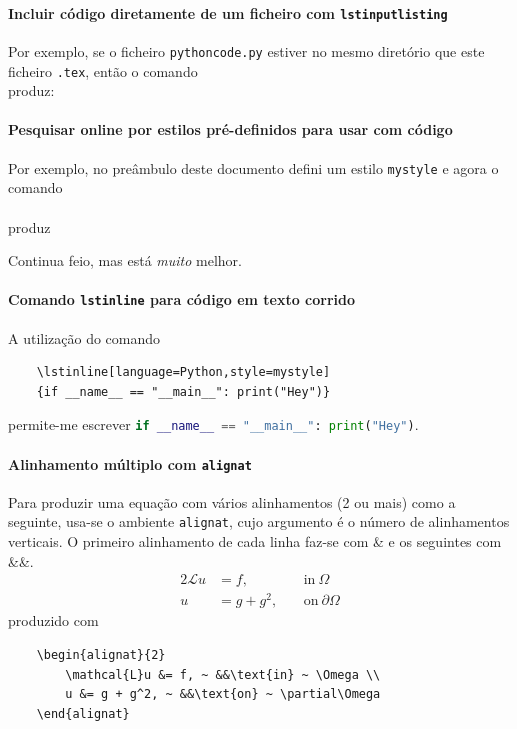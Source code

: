 \documentclass[11pt]{article}
\begin{document}
\paragraph{Incluir código diretamente de um ficheiro com \texttt{lstinputlisting}}
Por exemplo, se o ficheiro \texttt{pythoncode.py} estiver no mesmo diretório que
este ficheiro \texttt{.tex}, então o comando \\
\verb|| produz:



\paragraph{Pesquisar online por estilos pré-definidos para usar com código}
Por exemplo, no preâmbulo deste documento defini um estilo \texttt{mystyle} e agora
o comando \\
\verb|| \\
produz



Continua feio, mas está \textit{muito} melhor.

\paragraph{Comando \texttt{lstinline} para código em texto corrido}
A utilização do comando
\begin{verbatim}
    \lstinline[language=Python,style=mystyle]
    {if __name__ == "__main__": print("Hey")}
\end{verbatim}
permite-me escrever
\lstinline[language=Python,style=mystyle]{if __name__ == "__main__": print("Hey")}.

\paragraph{Alinhamento múltiplo com \texttt{alignat}}
Para produzir uma equação com vários alinhamentos (2 ou mais) como a seguinte,
usa-se o ambiente \texttt{alignat}, cujo argumento é o número de alinhamentos
verticais.
O primeiro alinhamento de cada linha faz-se com \& e os seguintes com \&\&.
\begin{alignat}{2}
    \mathcal{L}u &= f, ~ &&\text{in} ~ \Omega \\
    u &= g + g^2, ~ &&\text{on} ~ \partial\Omega
\end{alignat}
produzido com
\begin{verbatim}
    \begin{alignat}{2}
        \mathcal{L}u &= f, ~ &&\text{in} ~ \Omega \\
        u &= g + g^2, ~ &&\text{on} ~ \partial\Omega
    \end{alignat}
\end{verbatim}
\end{document}
